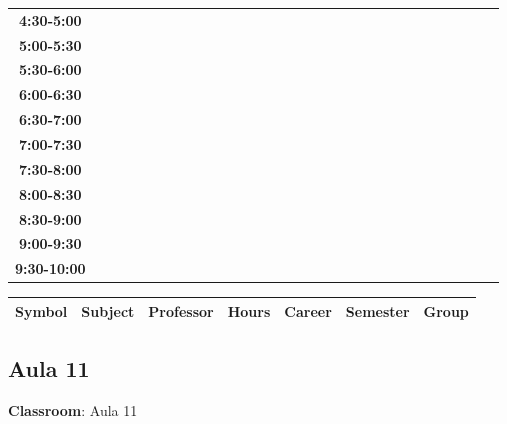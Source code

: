 \documentclass{article}
\begin{document}
\begin{table}[ht]
\begin{tabular}{|c|c|c|c|c|c|c|c|c|c|c|c|c|c|c|c|c|c|c|c|c|c|c|c|c|c|c|c|c|c|}
 \cline{1-8} 
\textbf{4:30-5:00} &   &   &   &   &   &   &   \\
 \cline{1-8} 
\textbf{5:00-5:30} &   &   &   &   &   &   &   \\
 \cline{1-8} 
\textbf{5:30-6:00} &   &   &   &   &   &   &   \\
 \cline{1-8} 
\textbf{6:00-6:30} &   &   &   &   &   &   &   \\
 \cline{1-8} 
\textbf{6:30-7:00} &   &   &   &   &   &   &   \\
 \cline{1-8} 
\textbf{7:00-7:30} &   &   &   &   &   &   &   \\
 \cline{1-8} 
\textbf{7:30-8:00} &   &   &   &   &   &   &   \\
 \cline{1-8} 
\textbf{8:00-8:30} &   &   &   &   &   &   &   \\
 \cline{1-8} 
\textbf{8:30-9:00} &   &   &   &   &   &   &   \\
 \cline{1-8} 
\textbf{9:00-9:30} &   &   &   &   &   &   &   \\
 \cline{1-8} 
\textbf{9:30-10:00} &   &   &   &   &   &   &   \\
 \cline{1-8} 
\end{tabular}\end{table}

        
        \begin{tabular}{|>{\centering\arraybackslash}m{2cm}|>{\centering\arraybackslash}m{4cm}|>{\centering\arraybackslash}m{2.15cm}|>{\centering\arraybackslash}m{1.8cm}|>{\centering\arraybackslash}m{2cm}|>{\centering\arraybackslash}m{2cm}|>{\centering\arraybackslash}m{2cm}|}
        \hline
        \textbf{Symbol} & \textbf{Subject} & \textbf{Professor} & \textbf{Hours} & \textbf{Career} & \textbf{Semester} & \textbf{Group} \\
        \hline
        \end{tabular}
                    

        \newpage
        

        \subsection{Aula 11}
        \vspace*{.1cm}
        
        \begin{flushright}
            {\LARGE \textbf{Classroom}: Aula 11}
        \end{flushright}
        \vspace{1cm}
\end{document}
